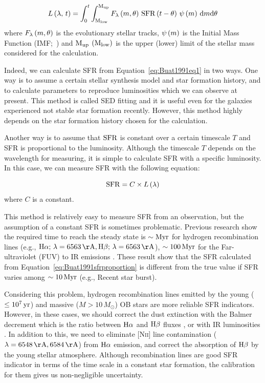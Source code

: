 \begin{equation}\label{eq:Buat1991eq1}
    L\left(\lambda,\,t\right)=\int_{0}^{t} \int_{\mathrm{M}_{\mathrm{low}}}^{\mathrm{M}_{\mathrm{up}}} F_{\lambda}\left(m, \theta\right)\,\mathrm{SFR}\left(t-\theta\right)\,\psi\left(m\right)\,\mathrm{d}m \mathrm{d} \theta
\end{equation}
where $F_{\lambda}\left(m, \theta\right)$ is the evolutionary stellar tracks, $\psi\left(m\right)$ is the Initial Mass Function (IMF;~\citealt{Salpeter1955, Kroupa2001, Chabrier2003}) and $\mathrm{M}_{\mathrm{up}}$ $\left(\mathrm{M}_{\mathrm{low}}\right)$ is the upper (lower) limit of the stellar mass considered for the calculation.

Indeed, we can calculate SFR from Equation~\ref{eq:Buat1991eq1} in two ways.
One way is to assume a certain stellar synthesis model and star formation history, and to calculate parameters to reproduce luminosities which we can observe at present.
This method is called SED fitting and it is useful even for the galaxies experienced not stable star formation recently.
However, this method highly depends on the star formation history chosen for the calculation.

Another way is to assume that $\mathrm{SFR}$ is constant over a certain timescale $T$ and SFR is proportional to the luminosity.
Although the timescale $T$ depends on the wavelength for measuring, it is simple to calculate SFR with a specific luminosity.
In this case, we can measure SFR with the following equation:

\begin{equation}\label{eq:Buat1991sfrproportion}
    \mathrm{SFR} = C \times L\left(\lambda\right)
\end{equation}
where $C$ is a constant.

This method is relatively easy to measure SFR from an observation, but the assumption of a constant SFR is sometimes problematic.
Previous research show the required time to reach the steady state is $\sim\mathrm{Myr}$ for hydrogen recombination lines (e.g., $\mr{H\alpha};\,\lambda = 6563\,\mr{\AA}, \mr{H\beta};\,\lambda = 6563\,\mr{\AA}$), $\sim 100\,\mathrm{Myr}$ for the Far-ultraviolet (FUV) to IR emissions \citep{Hao2011, Murphy2011, Kennicutt2012}.
These result show that the SFR calculated from Equation~\ref{eq:Buat1991sfrproportion} is different from the true value if SFR varies among $\sim 10\,\mathrm{Myr}$ (e.g., Recent star burst).

Considering this problem, hydrogen recombination lines emitted by the young ($\leq 10^7\,\mathrm{yr}$) and massive ($M > 10\,M_{\odot}$) OB stars are more reliable SFR indicators.
However, in these cases, we should correct the dust extinction with the Balmer decrement which is the ratio between $\mathrm{H\alpha}$ and $\mathrm{H\beta}$ fluxes \citep{Lequeux1981}, or with IR luminosities \citep{Kennicutt2009}.
In addition to this, we need to eliminate [N\textsc{ii}] line contamination ($\lambda = 6548\,\mr{\AA}, 6584\,\mr{\AA}$) from $\mathrm{H}\alpha$ emission, and correct the absorption of $\mathrm{H\beta}$ by the young stellar atmosphere.
Although recombination lines are good SFR indicator in terms of the time scale in a constant star formation, the calibration for them gives us non-negligible uncertainty.

